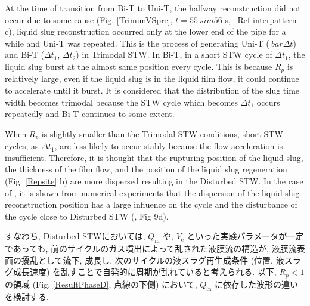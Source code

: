 \documentclass[aps,pre,preprint,groupedaddress,showkeys]{revtex4-2}
\begin{document}
At the time of transition from Bi-T to Uni-T, the halfway reconstruction did not occur due to some cause (Fig. \ref{TrimimVSpre}, $ t = 55 \ sim56 $ s, \ Ref {interpattern} c), liquid slug reconstruction occurred only at the lower end of the pipe for a while and Uni-T was repeated.
This is the process of generating Uni-T ($ \ bar {\Delta t} $) and Bi-T ($ \Delta t_ {1} $, $ \Delta t_ {2} $) in Trimodal STW.
In Bi-T, in a short STW cycle of $ \Delta t_ {1} $, the liquid slug burst at the almost same position every cycle.
This is because $ R_p $ is relatively large, even if the liquid slug is in the liquid film flow, it could continue to accelerate until it burst.
It is considered that the distribution of the slug time width becomes trimodal because the STW cycle which becomes $ \Delta t_ {1} $ occurs repeatedly and Bi-T continues to some extent.

When $ R_p $ is slightly smaller than the Trimodal STW conditions, short STW cycles, as $ \Delta t_ {1} $, are less likely to occur stably because the flow acceleration is insufficient.
Therefore, it is thought that the rupturing position of the liquid slug, the thickness of the film flow, and the position of the liquid slug regeneration (Fig. \ref{Repsite} b) are more dispersed resulting in the Disturbed STW.
In the case of \cite {kanno 2018}, it is shown from numerical experiments that the dispersion of the liquid slug reconstruction position has a large influence on the cycle and the disturbance of the cycle close to Disturbed STW (\cite{kanno2018}, Fig 9d).

すなわち, Disturbed STWにおいては, $Q_\mathrm{in}$ や, $V_\mathrm{c}$ といった実験パラメータが一定であっても, 前のサイクルのガス噴出によって乱された液膜流の構造が, 液膜流表面の擾乱として流下, 成長し, 次のサイクルの液スラグ再生成条件 (位置, 液スラグ成長速度) を乱すことで自発的に周期が乱れていると考えられる. 
以下, $R_p<1$ の領域 (Fig. \ref{ResultPhaseD}, 点線の下側) において, $Q_\mathrm{in}$ に依存した波形の違いを検討する.
 
\end{document}
